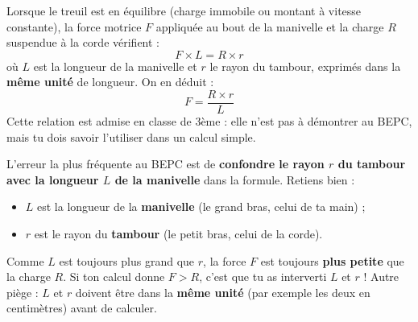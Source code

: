 \documentclass[11pt]{article}
\begin{document}
\begin{propriete}
Lorsque le treuil est en équilibre (charge immobile ou montant à vitesse constante), la force motrice $F$ appliquée au bout de la manivelle et la charge $R$ suspendue à la corde vérifient :
\[ F \times L = R \times r \]
où $L$ est la longueur de la manivelle et $r$ le rayon du tambour, exprimés dans la \textbf{même unité} de longueur. On en déduit :
\[ F = \dfrac{R \times r}{L} \]
Cette relation est admise en classe de 3ème : elle n'est pas à démontrer au BEPC, mais tu dois savoir l'utiliser dans un calcul simple.
\end{propriete}

\begin{attention}
L'erreur la plus fréquente au BEPC est de \textbf{confondre le rayon $r$ du tambour avec la longueur $L$ de la manivelle} dans la formule. Retiens bien :
\begin{itemize}
\item $L$ est la longueur de la \textbf{manivelle} (le grand bras, celui de ta main) ;
\item $r$ est le rayon du \textbf{tambour} (le petit bras, celui de la corde).
\end{itemize}
Comme $L$ est toujours plus grand que $r$, la force $F$ est toujours \textbf{plus petite} que la charge $R$. Si ton calcul donne $F > R$, c'est que tu as interverti $L$ et $r$ ! Autre piège : $L$ et $r$ doivent être dans la \textbf{même unité} (par exemple les deux en centimètres) avant de calculer.
\end{attention}
\end{document}

